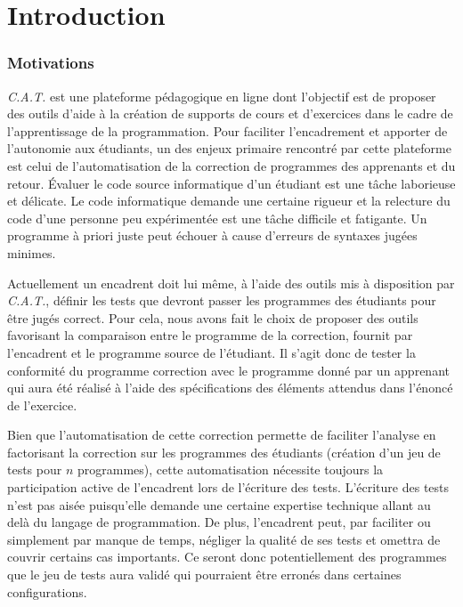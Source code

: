 \chapter*{Introduction}

\pagestyle{headings}

\subsection*{Motivations}
\textit{C.A.T.} est une plateforme pédagogique en ligne dont l'objectif est de proposer des outils d'aide à la création de supports de cours et d'exercices dans le cadre de l'apprentissage de la programmation. 
Pour faciliter l'encadrement et apporter de l'autonomie aux étudiants, un des enjeux primaire rencontré par cette plateforme est celui de l'automatisation de la correction de programmes des apprenants et du retour.
Évaluer le code source informatique d'un étudiant est une tâche laborieuse et délicate. Le code informatique demande une certaine rigueur et la relecture du code d'une personne peu expérimentée est une tâche difficile et fatigante. Un programme à priori juste peut échouer à cause d'erreurs de syntaxes jugées minimes.

Actuellement un encadrent doit lui même, à l'aide des outils mis à disposition par \textit{C.A.T.}, définir les tests que devront passer les programmes des étudiants pour être jugés correct. Pour cela, nous avons fait le choix de proposer des outils favorisant la comparaison entre le programme de la correction, fournit par l'encadrent et le programme source de l'étudiant.
Il s'agit donc de tester la conformité du programme correction avec le programme donné par un apprenant qui aura été réalisé à l'aide des spécifications des éléments attendus dans l'énoncé de l'exercice.

Bien que l'automatisation de cette correction permette de faciliter l'analyse en factorisant la correction sur les programmes des étudiants (création d'un jeu de tests pour $n$ programmes), cette automatisation nécessite toujours la participation active de l'encadrent lors de l'écriture des tests. L'écriture des tests n'est pas aisée puisqu'elle demande une certaine expertise technique allant au delà du langage de programmation. 
De plus, l'encadrent peut, par faciliter ou simplement par manque de temps, négliger la qualité de ses tests et omettra de couvrir certains cas importants. Ce seront donc potentiellement des programmes que le jeu de tests aura validé qui pourraient être erronés dans certaines configurations. 

